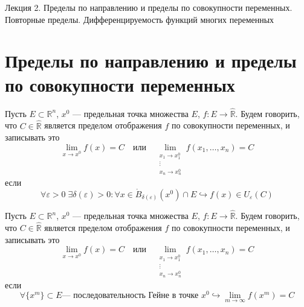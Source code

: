 \documentclass[11pt]{article}
\begin{document}
\begin{titlepage}
    \centering
    \vspace*{\fill}  %

    {\Huge Лекция 2. Пределы по направлению и пределы по совокупности переменных. Повторные пределы.
    Дифференцируемость функций многих переменных
    \par}

    \vspace*{\fill}  %
\end{titlepage}

\setcounter{page}{1}

\section{Пределы по направлению и пределы по совокупности переменных}

\begin{definition}
    Пусть $E \subset \mathbb{R}^n$, $x^0$ --- предельная точка множества $E$, $f \colon E \to \widehat{\mathbb{R}}$.
    Будем говорить, что $C \in \widehat{\mathbb{R}}$ является пределом отображения $f$ по совокупности переменных, и записывать 
    это
    \begin{equation*}
        \lim_{x \to x^0} f(x) = C 
        \quad \text{или} \quad 
        \lim\limits_{\substack{x_1 \to x_1^0 \\ \vdots \\ x_n \to x_n^0 }} f(x_1, \ldots, x_n) = C
    \end{equation*}
    если 
    \[\forall \varepsilon > 0 \; \exists \delta(\varepsilon) > 0: \forall x \in \mathring{B}_{\delta(\varepsilon)}\left(x^0\right) \cap E \hookrightarrow f(x) \in U_{\varepsilon}(C)\]
\end{definition}

\begin{definition}
    Пусть $E \subset \mathbb{R}^n$, $x^0$ --- предельная точка множества $E$, $f \colon E \to \widehat{\mathbb{R}}$.
    Будем говорить, что $C \in \widehat{\mathbb{R}}$ является пределом отображения $f$ по совокупности переменных, и записывать 
    это
    \begin{equation*}
        \lim_{x \to x^0} f(x) = C 
        \quad \text{или} \quad 
        \lim\limits_{\substack{x_1 \to x_1^0 \\ \vdots \\ x_n \to x_n^0 }} f(x_1, \ldots, x_n) = C
    \end{equation*}
    если 
    \[\forall \{x^m\} \subset E \text{--- последовательность Гейне в точке } x^0 \hookrightarrow \lim_{m \to \infty} f(x^m) = C\]
\end{definition}
\end{document}
